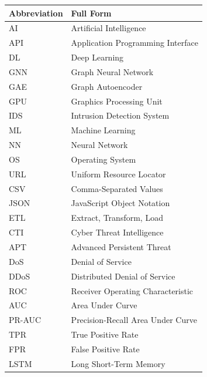 \documentclass[12pt,a4paper]{report}
\numberwithin{algorithm}{chapter}
\begin{document}
\noindent
\begin{tabular}{p{} p{}}
\hline
\textbf{Abbreviation} & \textbf{Full Form} \\
\hline

AI & Artificial Intelligence \\
API & Application Programming Interface \\

DL & Deep Learning \\
GNN & Graph Neural Network \\
GAE & Graph Autoencoder \\
GPU & Graphics Processing Unit \\

IDS & Intrusion Detection System \\

ML & Machine Learning \\
NN & Neural Network \\
OS & Operating System \\


URL & Uniform Resource Locator \\
CSV & Comma-Separated Values \\
JSON & JavaScript Object Notation \\
ETL & Extract, Transform, Load \\
CTI & Cyber Threat Intelligence \\
APT & Advanced Persistent Threat \\
DoS & Denial of Service \\
DDoS & Distributed Denial of Service \\
ROC & Receiver Operating Characteristic \\
AUC & Area Under Curve \\
PR-AUC & Precision-Recall Area Under Curve \\
TPR & True Positive Rate \\
FPR & False Positive Rate \\
LSTM & Long Short-Term Memory \\

\hline
\end{tabular}

\cleardoublepage
{}








\clearpage
\nocite{*}


\end{document}
